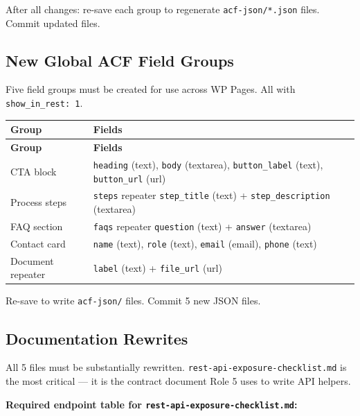 \documentclass[12pt,a4paper]{article}
\begin{document}
\vspace{0.8em}
After all changes: re-save each group to regenerate \texttt{acf-json/*.json} files.
Commit updated files.

\subsection{New Global ACF Field Groups}

Five field groups must be created for use across WP Pages. All with \texttt{show\_in\_rest: 1}.

\vspace{0.4em}
\begin{longtable}{@{}p{3.5cm}p{8.8cm}@{}}
\toprule
\rowcolor{uvtLightBlue}
\textbf{Group} & \textbf{Fields} \\
\midrule
\endfirsthead
\toprule
\rowcolor{uvtLightBlue}
\textbf{Group} & \textbf{Fields} \\
\midrule
\endhead
\bottomrule
\endfoot
CTA block & \texttt{heading} (text), \texttt{body} (textarea), \texttt{button\_label} (text), \texttt{button\_url} (url) \\
Process steps & \texttt{steps} repeater \textrightarrow{} \texttt{step\_title} (text) + \texttt{step\_description} (textarea) \\
FAQ section & \texttt{faqs} repeater \textrightarrow{} \texttt{question} (text) + \texttt{answer} (textarea) \\
Contact card & \texttt{name} (text), \texttt{role} (text), \texttt{email} (email), \texttt{phone} (text) \\
Document repeater & \texttt{label} (text) + \texttt{file\_url} (url) \\
\end{longtable}

Re-save to write \texttt{acf-json/} files. Commit 5 new JSON files.

\subsection{Documentation Rewrites}

All 5 files must be substantially rewritten. \texttt{rest-api-exposure-checklist.md} is the
most critical --- it is the contract document Role 5 uses to write API helpers.

\vspace{0.8em}
\noindent\textbf{Required endpoint table for \texttt{rest-api-exposure-checklist.md}:}
\end{document}

